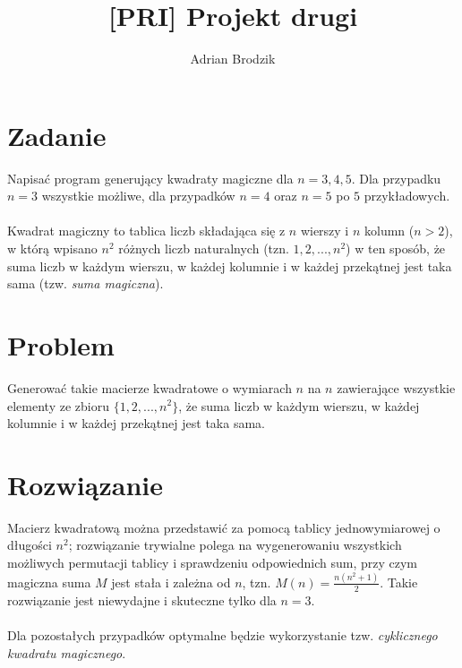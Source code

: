 \documentclass[a4paper, 12pt]{article}
\title{\bf [PRI] Projekt drugi}
\author{Adrian Brodzik}
\begin{document}
\maketitle

\section*{Zadanie}
Napisać program generujący kwadraty magiczne dla $n=3,4,5$. Dla przypadku $n=3$ wszystkie możliwe, dla przypadków $n=4$ oraz $n=5$ po $5$ przykładowych.
\\\\
Kwadrat magiczny to tablica liczb składająca się z $n$ wierszy i $n$ kolumn ($n>2$), w którą wpisano $n^{2}$ różnych liczb naturalnych (tzn. $1,2,...,n^{2}$) w ten sposób, że suma liczb w każdym wierszu, w każdej kolumnie i w każdej przekątnej jest taka sama (tzw. \textit{suma magiczna}).

\section*{Problem}
Generować takie macierze kwadratowe o wymiarach $n$ na $n$ zawierające wszystkie elementy ze zbioru $\{1,2,...,n^{2}\}$, że suma liczb w każdym wierszu, w każdej kolumnie i w każdej przekątnej jest taka sama.

\section*{Rozwiązanie}
Macierz kwadratową można przedstawić za pomocą tablicy jednowymiarowej o długości $n^{2}$; rozwiązanie trywialne polega na wygenerowaniu wszystkich możliwych permutacji tablicy i sprawdzeniu odpowiednich sum, przy czym magiczna suma $M$ jest stała i zależna od $n$, tzn. $M(n)=\frac{n(n^2+1)}{2}$. Takie rozwiązanie jest niewydajne i skuteczne tylko dla $n=3$.
\\
\\
Dla pozostałych przypadków optymalne będzie wykorzystanie tzw. \textit{cyklicznego kwadratu magicznego}.
\end{document}
